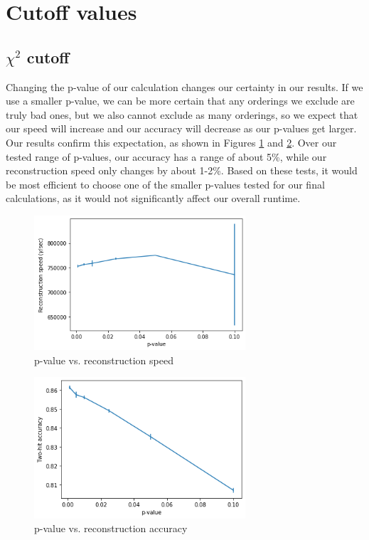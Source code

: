 \section{Cutoff values}
\subsection{$\chi^2$ cutoff}
Changing the p-value of our calculation changes our certainty in our results. If we use a smaller p-value, we can be more certain that any orderings we exclude are truly bad ones, but we also cannot exclude as many orderings, so we expect that our speed will increase and our accuracy will decrease as our p-values get larger. Our results confirm this expectation, as shown in Figures \ref{fig:p_speed} and \ref{fig:p_acc}. Over our tested range of p-values, our accuracy has a range of about 5\%, while our reconstruction speed only changes by about 1-2\%. Based on these tests, it would be most efficient to choose one of the smaller p-values tested for our final calculations, as it would not significantly affect our overall runtime.

\begin{figure}
    \centering
    \includegraphics[width=0.7\textwidth]{graphs/pi_p_speed.png}
    \caption{p-value vs. reconstruction speed}
    \label{fig:p_speed}
\end{figure}

\begin{figure}
    \centering
    \includegraphics[width=0.7\textwidth]{graphs/pi_p_acc.png}
    \caption{p-value vs. reconstruction accuracy}
    \label{fig:p_acc}
\end{figure}

